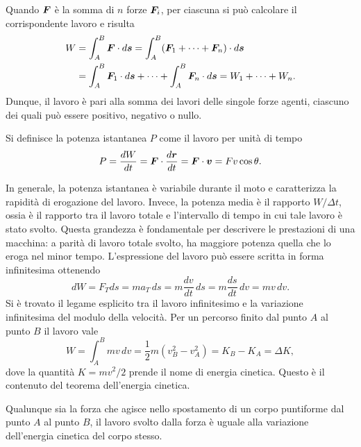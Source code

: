 Quando $\bm{F}$ è la somma di $n$ forze $\bm{F}_i$, per ciascuna si può calcolare il corrispondente lavoro e risulta
\begin{equation}
    \begin{split}
        W&=\int_A^B\bm{F}\cdot d\bm{s}=\int_A^B(\bm{F}_1+\cdots+\bm{F}_n)\cdot d\bm{s} \\
        &=\int_A^B\bm{F}_1\cdot d\bm{s}+\cdots+\int_A^B\bm{F}_n\cdot d\bm{s}=W_1+\cdots+W_n.
    \end{split}
\end{equation}
Dunque, il lavoro è pari alla somma dei lavori delle singole forze agenti, ciascuno dei quali può essere positivo, negativo o nullo. 
\begin{defn}
    Si definisce la potenza istantanea $P$ come il lavoro per unità di tempo
    \begin{equation}
        P=\frac{dW}{dt}=\bm{F}\cdot\frac{d\bm{r}}{dt}=\bm{F}\cdot\bm{v}=Fv\cos{\theta}.
    \end{equation}
\end{defn}
In generale, la potenza istantanea è variabile durante il moto e caratterizza la rapidità di erogazione del lavoro. Invece, la potenza media è il rapporto $W/\Delta t$, ossia è il rapporto tra il lavoro totale e l'intervallo di tempo in cui tale lavoro è stato svolto. Questa grandezza è fondamentale per descrivere le prestazioni di una macchina: a parità di lavoro totale svolto, ha maggiore potenza quella che lo eroga nel minor tempo. L'espressione del lavoro può essere scritta in forma infinitesima ottenendo
\begin{equation}
    dW=F_Tds=ma_T\,ds=m\frac{dv}{dt}\,ds=m\frac{ds}{dt}\,dv=mv\,dv.
\end{equation}
Si è trovato il legame esplicito tra il lavoro infinitesimo e la variazione infinitesima del modulo della velocità. Per un percorso finito dal punto $A$ al punto $B$ il lavoro vale
\begin{equation}
    W=\int_A^Bmv\,dv=\frac{1}{2}m(v_B^2-v_A^2)=K_B-K_A=\Delta K,
\end{equation}
dove la quantità $K=mv^2/2$ prende il nome di energia cinetica. Questo è il contenuto del teorema dell'energia cinetica.
\begin{teo}
    Qualunque sia la forza che agisce nello spostamento di un corpo puntiforme dal punto $A$ al punto $B$, il lavoro svolto dalla forza è uguale alla variazione dell'energia cinetica del corpo stesso.
\end{teo}

